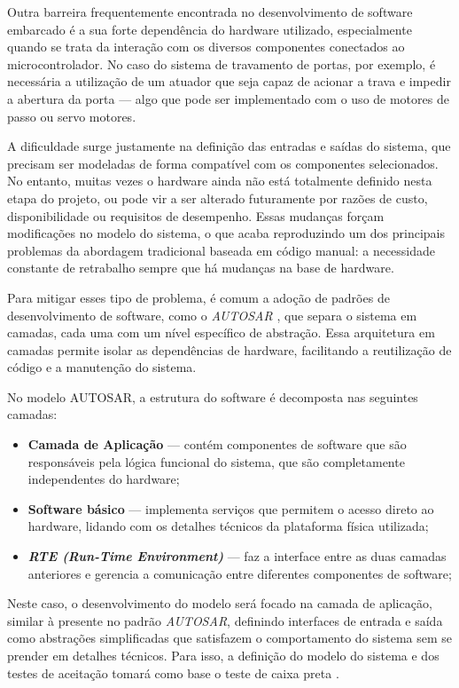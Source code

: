 Outra barreira frequentemente  encontrada no desenvolvimento de software embarcado é a sua forte dependência do hardware utilizado, especialmente quando se trata 
da interação com os diversos componentes conectados ao microcontrolador. No caso do sistema de travamento de portas, por exemplo, é necessária a utilização de um 
atuador que seja capaz de acionar a trava e impedir a abertura da porta — algo que pode ser implementado com o uso de motores de passo ou servo motores.

A dificuldade surge justamente na definição das entradas e saídas do sistema, que precisam ser modeladas de forma compatível com os componentes selecionados. No 
entanto, muitas vezes o hardware ainda não está totalmente definido nesta etapa do projeto, ou pode vir a ser alterado futuramente por razões de custo, 
disponibilidade ou requisitos de desempenho. Essas mudanças forçam modificações no modelo do sistema, o que acaba reproduzindo um dos principais problemas da 
abordagem tradicional baseada em código manual: a necessidade constante de retrabalho sempre que há mudanças na base de hardware.

Para mitigar esses tipo de problema, é comum a adoção de padrões de desenvolvimento de software, como o \textit{AUTOSAR} \cite{autosarClassic}, que separa o sistema em 
camadas, cada uma com um nível específico de abstração. Essa arquitetura em camadas permite isolar as dependências de hardware, facilitando a reutilização de 
código e a manutenção do sistema. 

No modelo AUTOSAR, a estrutura do software é decomposta nas seguintes camadas:

\begin{itemize}
	\item \textbf{Camada de Aplicação} — contém componentes de software que são responsáveis pela lógica funcional do sistema, que são completamente independentes do hardware;
	\item \textbf{Software básico} — implementa serviços que permitem o acesso direto ao hardware, lidando com os detalhes técnicos da plataforma física utilizada;
	\item \textbf{\textit{RTE (Run-Time Environment)}} — faz a interface entre as duas camadas anteriores e gerencia a comunicação entre diferentes componentes de software;
\end{itemize}

Neste caso, o desenvolvimento do modelo será focado na camada de aplicação, similar à presente no padrão \textit{AUTOSAR}, definindo interfaces de entrada e saída como 
abstrações simplificadas que satisfazem o comportamento do sistema sem se prender em detalhes técnicos. Para isso, a definição do modelo do sistema e dos testes 
de aceitação tomará como base o teste de caixa preta \cite{sommerville2019}.


